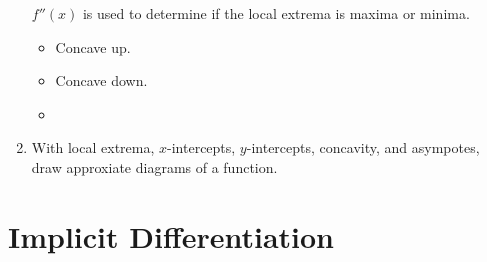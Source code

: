 \documentclass[12pt, a4paper]{article}
\begin{document}
\begin{enumerate}
    $f''(x)$ is used to determine if the local extrema is maxima or minima.
    \begin{itemize}
        \item {\color{red}{Minima: $f''(x)>0$}} Concave up.
        \item {\color{red}{Maxima: $f''(x)<0$}} Concave down.
        \item {}
    \end{itemize}
    \item With local extrema, $x$-intercepts, $y$-intercepts, concavity, and asympotes, draw approxiate diagrams of a function.
\end{enumerate}

\section{Implicit Differentiation}
\end{document}
